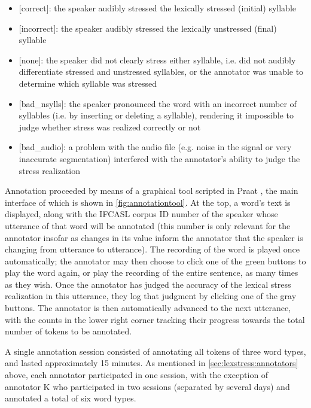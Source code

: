 	\begin{itemize}
	\item{[correct]: the speaker audibly stressed the lexically stressed (initial) syllable}
	\item{[incorrect]: the speaker audibly stressed the lexically unstressed (final) syllable}
	\item{[none]: the speaker did not clearly stress either syllable, i.e. did not audibly differentiate stressed and unstressed syllables, or the annotator was unable to determine which syllable was stressed}
	\item{[bad\_nsylls]: the speaker pronounced the word with an incorrect number of syllables (i.e. by inserting or deleting a syllable), rendering it impossible to judge whether stress was realized correctly or not}
	\item{[bad\_audio]: a problem with the audio file (e.g. noise in the signal or very inaccurate segmentation) interfered with the annotator's ability to judge the stress realization}
	 \end{itemize}
	
	Annotation proceeded by means of a graphical tool scripted in Praat \parencite{Boersma2014}, the main interface of which is shown in \cref{fig:annotationtool}. At the top, a word's text is displayed, along with the IFCASL corpus ID number of the speaker whose utterance of that word will be annotated (this number is only relevant for the annotator insofar as changes in its value inform the annotator that the speaker is changing from utterance to utterance). The recording of the word
is played once automatically; the annotator may then choose to click one of the green buttons to play the word again, or play the recording of the entire sentence, as many times as they wish. Once the annotator has judged the accuracy of the lexical stress realization in this utterance, they log that judgment by clicking one of the gray buttons. The annotator is then automatically advanced to the next utterance, with the counts in the lower right corner tracking their progress towards the total number of tokens to be annotated. 

A single annotation session consisted of annotating all tokens of three word types, and lasted approximately 15 minutes. As mentioned in \cref{sec:lexstress:annotators} above, each annotator participated in one session, with the exception of annotator K who participated in two sessions (separated by several days) and annotated a total of six word types.
	
